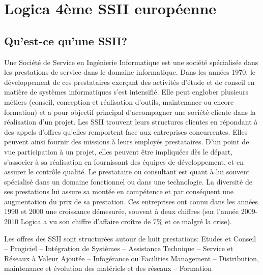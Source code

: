 \chapter{Logica 4ème SSII européenne}

\section{Qu'est-ce qu'une SSII?}
Une Société de Service en Ingénierie Informatique est une société spécialisée dans les prestations de service dans le domaine informatique. Dans les années 1970, le développement de ces prestataires exerçant des activités d’étude et de conseil en matière de systèmes informatiques s’est intensifié. Elle peut englober plusieurs métiers (conseil, conception et réalisation d'outils, maintenance ou encore formation) et a pour objectif principal d'accompagner une société cliente dans la réalisation d'un projet.
Les SSII trouvent leurs structures clientes en répondant à des appels d’offres qu’elles remportent face aux entreprises concurrentes. Elles peuvent ainsi fournir des missions à leurs employés prestataires. D’un point de vue participation à un projet, elles peuvent être impliquées dès le départ, s'associer à sa réalisation en fournissant des équipes de développement, et en assurer le contrôle qualité.
Le prestataire ou consultant est quant à lui souvent spécialisé dans un domaine fonctionnel ou dans une technologie. La diversité de ses prestations lui assure sa montée en compétence et par conséquent une augmentation du prix de sa prestation.
Ces entreprises ont connu dans les années 1990 et 2000 une croissance démesurée, souvent à deux chiffres (sur l'année 2009-2010 Logica a vu son chiffre d'affaire croître de 7\% et ce malgré la crise).

Les offres des SSII sont structurées autour de huit prestations:
Etudes et Conseil – Progiciel – Intégration de Systèmes – Assistance Technique – Service et Réseaux à Valeur Ajoutée – Infogérance ou Facilities Management – Distribution, maintenance et évolution des matériels et des réseaux – Formation

